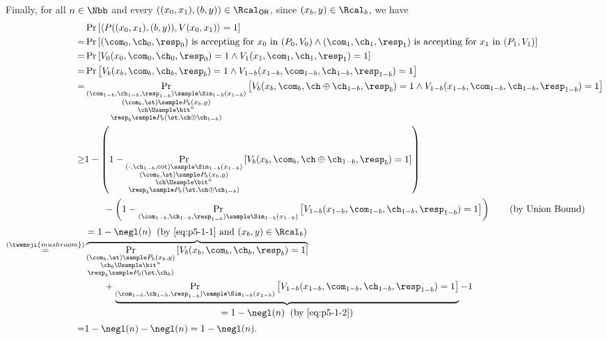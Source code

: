 \begin{answer}
    Finally, for all $n\in\Nbb$ and every $((x_0, x_1), (b,y))\in\Rcal_\mathsf{OR}$, since $(x_b, y)\in\Rcal_b$, we have
    \begin{align*}
        &\Pr\left[\langle P((x_0, x_1), (b, y)), V(x_0, x_1) \rangle = 1\right]\\
        =& \Pr\left[(\com_0, \ch_0, \resp_0)\textrm{ is accepting for } x_0 \textrm{ in } (P_0, V_0) \land (\com_1, \ch_1, \resp_1)\textrm{ is accepting for } x_1 \textrm{ in } (P_1, V_1) \right]\\
        =& \Pr\left[ V_0(x_0, \com_0, \ch_0, \resp_0)=1 \land V_1(x_1, \com_1, \ch_1, \resp_1)=1\right]\\
        =& \Pr\left[ V_b(x_b, \com_b, \ch_b, \resp_b)=1 \land V_{1-b}(x_{1-b}, \com_{1-b}, \ch_{1-b}, \resp_{1-b})=1\right]\\
        =& \Pr_{\substack{(\com_{1-b}, \ch_{1-b}, \resp_{1-b})\sample \Sim_{1-b}(x_{1-b})\\(\com_b, \st)\sample P_b(x_b, y)\\\ch \Usample \bit^n \\\resp_b\sample  P_b(\st, \ch\oplus \ch_{1-b})}}\left[ V_b(x_b, \com_b, \ch\oplus \ch_{1-b}, \resp_b)=1 \land V_{1-b}(x_{1-b}, \com_{1-b}, \ch_{1-b}, \resp_{1-b})=1\right]\\
        \ge& 1-\left(1- \Pr_{\substack{(\cdot, \ch_{1-b},\cot)\sample \Sim_{1-b}(x_{1-b})\\(\com_b, \st)\sample P_b(x_b, y)\\\ch \Usample \bit^n \\\resp_b\sample  P_b(\st, \ch\oplus \ch_{1-b})}}\left[ V_b(x_b, \com_b, \ch\oplus \ch_{1-b}, \resp_b)=1 \right]\right)\\
        &\qquad -\left(1- \Pr_{(\com_{1-b}, \ch_{1-b}, \resp_{1-b})\sample \Sim_{1-b}(x_{1-b})}\left[ V_{1-b}(x_{1-b}, \com_{1-b}, \ch_{1-b}, \resp_{1-b})=1\right] \right)
        \qquad (\textrm{by Union Bound})\\
        \stackrel{(\twemoji{mushroom})}=&  \overbrace{\Pr_{\substack{(\com_b, \st)\sample P_b(x_b, y)\\\ch_b \Usample \bit^n \\\resp_b\sample  P_b(\st, \ch_b)}}\left[ V_b(x_b, \com_b, \ch_b, \resp_b)=1 \right]}^{\begin{aligned}=1-\negl(n)\;\; (\textrm{by \eqref{eq:p5-1-1} and } (x_b, y)\in\Rcal_b)\end{aligned}}\\
        &\qquad + \underbrace{\Pr_{(\com_{1-b}, \ch_{1-b}, \resp_{1-b})\sample \Sim_{1-b}(x_{1-b})}\left[ V_{1-b}(x_{1-b}, \com_{1-b}, \ch_{1-b}, \resp_{1-b})=1\right]}_{\begin{aligned}=1-\negl(n)\;\; (\textrm{by \eqref{eq:p5-1-2}})\end{aligned}}
        -1\\
        =& 1-\negl(n)-\negl(n)= 1-\negl(n).
    \end{align*}


\end{answer}
